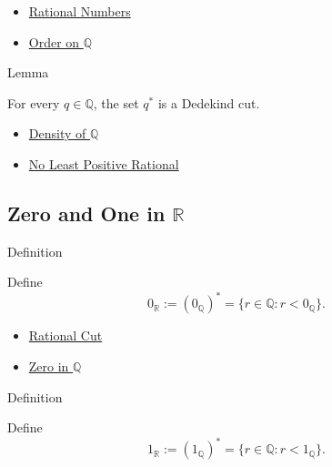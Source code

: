 \begin{dependencies}
\begin{itemize}
  \item \hyperref[def:rationals]{Rational Numbers}
  \item \hyperref[def:order-on-q]{Order on $\mathbb{Q}$}
\end{itemize}
\end{dependencies}

\begin{lemmabox}{Lemma}
\begin{lemma}
\label{lem:rational-cut-is-a-cut}
For every $q\in\mathbb{Q}$, the set $q^{\ast}$ is a Dedekind cut.
\end{lemma}
\end{lemmabox}

\begin{dependencies}
\begin{itemize}
  \item \hyperref[thm:density-of-q]{Density of $\mathbb{Q}$}
  \item \hyperref[prop:no-least-positive-rational]{No Least Positive Rational}
\end{itemize}
\end{dependencies}

\subsection*{Zero and One in $\mathbb{R}$}

\begin{definitionbox}{Definition}
\begin{definition}
\label{def:zero-in-r}
Define
\[
0_{\mathbb{R}}:=(0_{\mathbb{Q}})^{\ast}
=\{r\in\mathbb{Q}:r<0_{\mathbb{Q}}\}.
\]
\end{definition}
\end{definitionbox}

\begin{dependencies}
\begin{itemize}
  \item \hyperref[def:rational-cut]{Rational Cut}
  \item \hyperref[def:zero-in-q]{Zero in $\mathbb{Q}$}
\end{itemize}
\end{dependencies}

\begin{definitionbox}{Definition}
\begin{definition}
\label{def:one-in-r}
Define
\[
1_{\mathbb{R}}:=(1_{\mathbb{Q}})^{\ast}
=\{r\in\mathbb{Q}:r<1_{\mathbb{Q}}\}.
\]
\end{definition}
\end{definitionbox}

